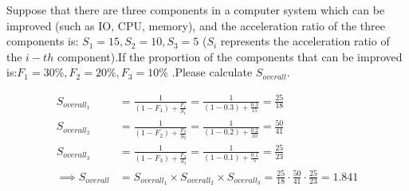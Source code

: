 \begin{exercise}[]{Suppose that there are three components in a computer system which can be improved (such as IO, CPU, memory), and the acceleration ratio of the three components is: $S_1=15,S_2=10,S_3=5$ ($S_i$ represents the acceleration ratio of the $i-th$ component).If the proportion of the components that can be improved is:$F_1=30\%,F_2=20\%,F_3=10\%$ .Please calculate $S_{overall}$.}
  \begin{solution}
  \begin{equation}
    \begin{aligned}
        S_{overall_{1}} &=\frac{1}{\left(1-F_1\right)+\frac{F_1}{S_1}} =\frac{1}{(1-0.3)+\frac{0.3}{15}}=\frac{25}{18} \\
        S_{overall_{2}}&=\frac{1}{\left(1-F_2\right)+\frac{F_2}{S_2}} =\frac{1}{(1-0.2)+\frac{0.2}{10}}=\frac{50}{41} \\
        S_{overall_{3}}&=\frac{1}{\left(1-F_3\right)+\frac{F_3}{S_3}} =\frac{1}{(1-0.1)+\frac{0.1}{5}}=\frac{25}{23} \\
        \implies S_{overall} &= S_{overall_{1}} \times S_{overall_{2}} \times S_{overall_{3}} =  \frac{25}{18} \cdot\frac{50}{41} \cdot \frac{25}{23}  = 1.841
        \end{aligned}
  \end{equation}
  \end{solution}
  \label{ex2}
\end{exercise}


